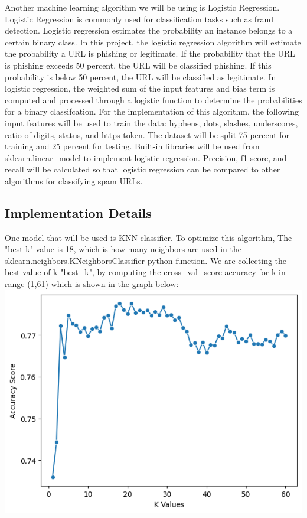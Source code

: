 \documentclass[conference]{IEEEtran}
\begin{document}
Another machine learning algorithm we will be using is Logistic Regression. Logistic Regression is commonly used for classification tasks such as fraud detection. 
Logistic regression estimates the probability an instance belongs to a certain binary class.
 In this project, the logistic regression algorithm will estimate the probability a URL is phishing or legitimate.
  If the probability that the URL is phishing exceeds 50 percent, the URL will be classified phishing. 
  If this probability is below 50 percent, the URL will be classified as legitimate. 
  In logistic regression, the weighted sum of the input features and bias term is computed and processed through a logistic function to determine the probabilities for a binary classifcation. 
  For the implementation of this algorithm, the following input features will be used to train the data: hyphens, dots, slashes, underscores, ratio of digits, status, and https token. The dataset will be split 75 percent for training and 25 percent for testing. 
  Built-in libraries will be used from sklearn.linear_model to implement logistic regression. Precision, f1-score, and recall will be calculated so that logistic regression can be compared to other algorithms for classifying spam URLs. 


\subsection{Implementation Details}
One model that will be used is KNN-classifier. To optimize this algorithm, The "best k" value is 18, which is how many neighbors are used in the sklearn.neighbors.KNeighborsClassifier python function. We are collecting the best value of k "best_k", by computing the cross_val_score accuracy for k in range (1,61) which is shown in the graph below:
\includegraphics{best-k-value.png}
\end{document}
